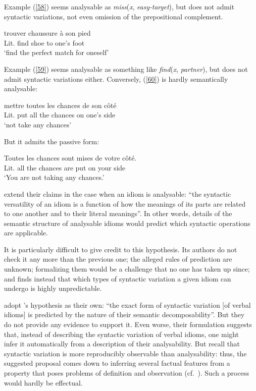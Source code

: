 \documentclass[output=paper]{langsci/langscibook}
\begin{document}
\noindent Example (\ref{58}) seems analysable as \textit{miss}(\textit{x}, \textit{easy-target}), but does not admit syntactic variations, not even omission of the prepositional complement.

\begin{exe}
\ex \label{59}
trouver chaussure à son pied\\
Lit. find shoe to one’s foot\\
‘find the perfect match for oneself’
\end{exe}

\noindent Example (\ref{59}) seems analysable as something like \textit{find}(\textit{x}, \textit{partner}), but does not admit syntactic variations either. Conversely, (\ref{60}) is hardly semantically analysable:

\begin{exe}
\ex \label{60}
mettre toutes les chances de son côté\\
Lit. put all the chances on one’s side\\
‘not take any chances’
\end{exe}

\noindent But it admits the passive form:

\begin{exe}
\ex \label{61}
Toutes les chances sont mises de votre côté.\\
Lit. all the chances are put on your side\\
‘You are not taking any chances.’
\end{exe}

\cite[512]{Nunberg1994}  extend their claims in the case when an idiom is analysable: “the syntactic versatility of an idiom is a function of how the meanings of its parts are related to one another and to their literal meanings”. In other words, details of the semantic structure of analysable idioms would predict which syntactic operations are applicable.

It is particularly difficult to give credit to this hypothesis. Its authors do not check it any more than the previous one; the alleged rules of prediction are unknown; formalizing them would be a challenge that no one has taken up since; and \citet{Riehemann:01} finds instead that which types of syntactic variation a given idiom can undergo is highly unpredictable.

\cite[280]{Baldwin2010} adopt \citep{Nunberg1994}'s hypothesis as their own: “the exact form of syntactic variation [of verbal idioms] is predicted by the nature of their semantic decomposability”. But they do not provide any evidence to support it. Even worse, their formulation suggests that, instead of describing the syntactic variation of verbal idioms, one might infer it automatically from a description of their analysability. But recall that syntactic variation is more reproducibly observable than analysability: thus, the suggested proposal comes down to inferring several factual features from a property that poses problems of definition and observation (cf.\ ). Such a process would hardly be effectual.
\end{document}
